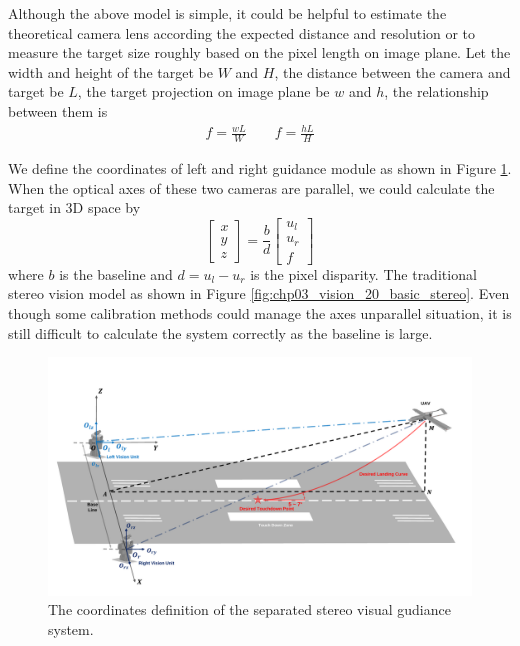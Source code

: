 \documentclass[journal,article,submit,moreauthors,pdftex,10pt,a4paper]{mdpi}
\begin{document}
Although the above model is simple, it could be helpful to estimate the theoretical camera lens according the expected distance and resolution or to measure the target size roughly based on the pixel length on image plane. Let the width and height of the target be $W$ and $H$, the distance between the camera and target be $L$, the target projection on image plane be $w$ and $h$, the relationship between them is  
\begin{align}
	f=\frac{wL}{W} \qquad f=\frac{hL}{H}
\end{align}

We define the coordinates of left and right guidance module as shown in Figure \ref{fig:Fig04_GeneralSystem}. When the optical axes of these two cameras are parallel, we could calculate the target in 3D space by
\begin{equation}
	\left[ {\begin{array}{*{20}{c}}
			x \\ 
			y \\ 
			z 
	\end{array}} \right] =\frac{b}{d} \left[ {\begin{array}{*{20}{c}}
			u_l \\ 
			u_r \\ 
			f 
	\end{array}} \right]
\end{equation}
where $b$ is the baseline and $d=u_l-u_r$ is the pixel disparity. The traditional stereo vision model as shown in Figure \ref{fig:chp03_vision_20_basic_stereo}. Even though some calibration methods could manage the axes unparallel situation, it is still difficult to calculate the system correctly as the baseline is large.
\begin{figure}[!t]
	\centering
	\includegraphics[width=\textwidth]{Figs/Fig04_GeneralSystem.pdf}
	\caption{The coordinates definition of the separated stereo visual gudiance system.}
	\label{fig:Fig04_GeneralSystem}
\end{figure}
\end{document}

